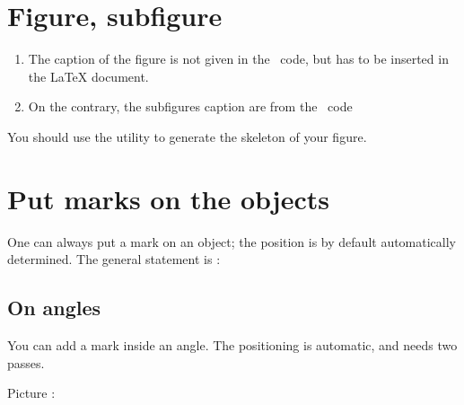 \section{Figure, subfigure}

\begin{enumerate}
    \item
        The caption of the figure is not given in the \yanntricks\ code, but has to be inserted in the LaTeX document.
    \item 
        On the contrary, the subfigures caption are from the \yanntricks\ code
\end{enumerate}
You should use the utility  to generate the skeleton of your figure.

\section{Put marks on the objects}

One can always put a mark on an object; the position is by default automatically determined. The general statement is :



\subsection{On angles}

You can add a mark inside an angle. The positioning is automatic, and needs two passes.

\begin{example}

    

Picture : 
\begin{center}
   
\end{center}

\end{example}


